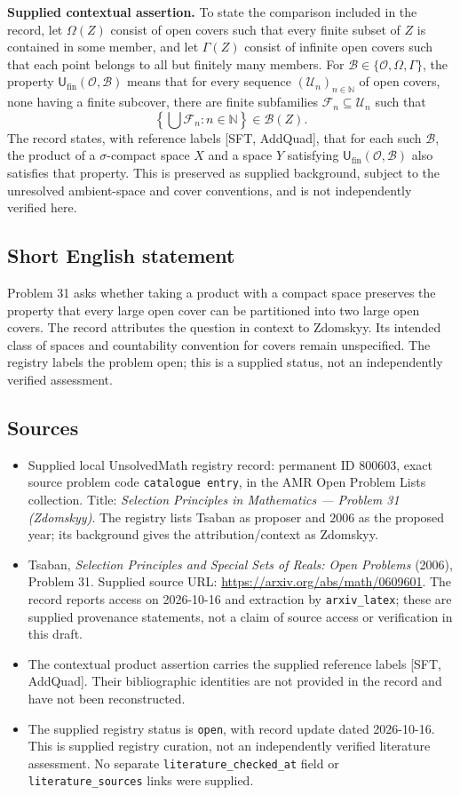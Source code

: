\documentclass[11pt]{article}
\newcommand{\N}{\mathbb{N}}
\begin{document}
\textbf{Supplied contextual assertion.} To state the comparison included in the record, let \(\Omega(Z)\) consist of open covers such that every finite subset of \(Z\) is contained in some member, and let \(\Gamma(Z)\) consist of infinite open covers such that each point belongs to all but finitely many members. For \(\mathscr{B}\in\{\mathcal{O},\Omega,\Gamma\}\), the property \(\mathsf{U}_{\mathrm{fin}}(\mathcal{O},\mathscr{B})\) means that for every sequence \((\mathcal{U}_n)_{n\in\N}\) of open covers, none having a finite subcover, there are finite subfamilies \(\mathcal{F}_n\subseteq\mathcal{U}_n\) such that
\[
\left\{\bigcup\mathcal{F}_n:n\in\N\right\}\in\mathscr{B}(Z).
\]
The record states, with reference labels [SFT, AddQuad], that for each such \(\mathscr{B}\), the product of a \(\sigma\)-compact space \(X\) and a space \(Y\) satisfying \(\mathsf{U}_{\mathrm{fin}}(\mathcal{O},\mathscr{B})\) also satisfies that property. This is preserved as supplied background, subject to the unresolved ambient-space and cover conventions, and is not independently verified here.
\subsection{Short English statement}
Problem 31 asks whether taking a product with a compact space preserves the property that every large open cover can be partitioned into two large open covers. The record attributes the question in context to Zdomskyy. Its intended class of spaces and countability convention for covers remain unspecified. The registry labels the problem open; this is a supplied status, not an independently verified assessment.
\subsection{Sources}
\begin{itemize}
\item Supplied local UnsolvedMath registry record: permanent ID \(800603\), exact source problem code \texttt{catalogue entry}, in the AMR Open Problem Lists collection. Title: \emph{Selection Principles in Mathematics --- Problem 31 (Zdomskyy)}. The registry lists Tsaban as proposer and \(2006\) as the proposed year; its background gives the attribution/context as Zdomskyy.
\item Tsaban, \emph{Selection Principles and Special Sets of Reals: Open Problems} (2006), Problem 31. Supplied source URL: \url{https://arxiv.org/abs/math/0609601}. The record reports access on 2026-10-16 and extraction by \texttt{arxiv\_latex}; these are supplied provenance statements, not a claim of source access or verification in this draft.
\item The contextual product assertion carries the supplied reference labels [SFT, AddQuad]. Their bibliographic identities are not provided in the record and have not been reconstructed.
\item The supplied registry status is \texttt{open}, with record update dated 2026-10-16. This is supplied registry curation, not an independently verified literature assessment. No separate \texttt{literature\_checked\_at} field or \texttt{literature\_sources} links were supplied.
\end{itemize}
\end{document}
